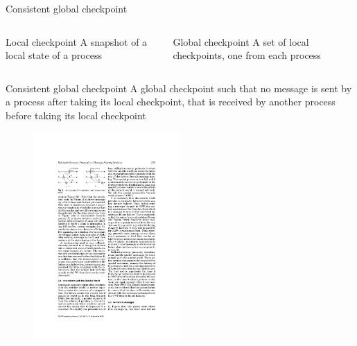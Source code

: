 \begin{frame}{Consistent global checkpoint}

\begin{columns}
\begin{column}{0.48\textwidth}
\begin{block}{\alert{Local checkpoint}}
A snapshot of a local state of a process
\end{block}
\end{column}
\begin{column}{0.48\textwidth}
\begin{block}{\alert{Global checkpoint}}
A set of local checkpoints, one from each process
\end{block}
\end{column}
\end{columns}

\begin{block}{\alert{Consistent global checkpoint}}
A global checkpoint such that no message is sent by a process after taking its
local checkpoint, that is received by another process before taking its local
checkpoint
\end{block}
\begin{figure}
	\includegraphics[width=0.5\textwidth]{figs/16/consistent}
\end{figure}
\end{frame}

